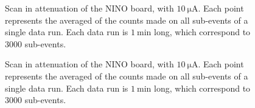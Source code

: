 \begin{figure}[hbtp]
\centering
{}
\caption{Scan in attenuation of the NINO board, with $\SI{10}{\micro \ampere}$. Each point represents the averaged of the counts made on all sub-events of a single data run. Each data run is $\SI{1}{\minute}$ long, which correspond to $3000$ sub-events.}
\label{fig:AttScanB}
\end{figure}

\begin{figure}[hbtp]
\centering
{}
\caption{Scan in attenuation of the NINO board, with $\SI{10}{\micro \ampere}$. Each point represents the averaged of the counts made on all sub-events of a single data run. Each data run is $\SI{1}{\minute}$ long, which correspond to $3000$ sub-events.}\label{fig:AttScan}
\end{figure}

